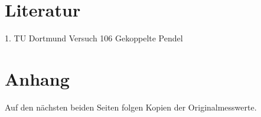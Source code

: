 \section{Literatur}
\label{sec:literatur}
1. TU Dortmund Versuch 106 Gekoppelte Pendel\\
\section{Anhang}
\label{sec:anhang}
Auf den nächsten beiden Seiten folgen Kopien der Originalmesswerte.